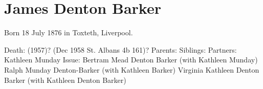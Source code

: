 \section{James Denton Barker}\label{James_Denton_Barker}

Born 18 July 1876 in Toxteth, Liverpool.\cite{JDB_BirthCert}

Death: 	(1957)? (Dec 1958 St. Albans 4b 161)?
Parents: 	
Siblings: 	
Partners: 	Kathleen Munday
Issue: 	Bertram Mead Denton Barker (with Kathleen Munday)
Ralph Munday Denton-Barker (with Kathleen Barker)
Virginia Kathleen Denton Barker (with Kathleen Denton Barker)
